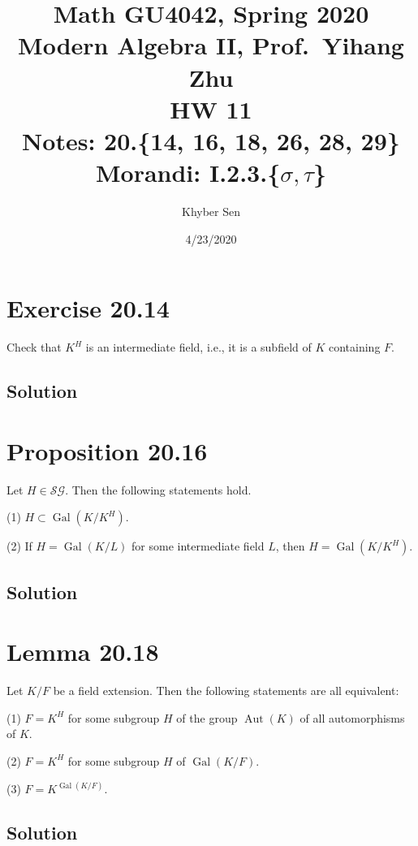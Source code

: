 \documentclass[fleqn]{article}
\title{
Math GU4042, Spring 2020 \\
Modern Algebra II, Prof.\ Yihang Zhu \\
HW 11 \\
Notes: 20.\{14, 16, 18, 26, 28, 29\} \\
Morandi: I.2.3.\{$\sigma, \tau$\} \\
}
\author{Khyber Sen}
\date{4/23/2020}
\DeclareMathOperator{\Gal}{Gal}
\DeclareMathOperator{\Aut}{Aut}
\begin{document}
    
    \maketitle
    
    \section{Exercise 20.14}
    Check that $K^H$ is an intermediate field, i.e., it is a subfield of $K$ containing $F$.
        
        \subsection{Solution}
        
    
    \section{Proposition 20.16}
    Let $H \in \mathcal{SG}$.  Then the following statements hold.
    
    (1) $H \subset \Gal\left(K/K^H\right)$.
    
    (2) If $H = \Gal(K/L)$ for some intermediate field $L$, then $H = \Gal\left(K/K^H\right)$.
        
        \subsection{Solution}
        
    
    \section{Lemma 20.18}
    Let $K/F$ be a field extension.  Then the following statements are all equivalent:
    
    (1) $F = K^H$ for some subgroup $H$ of the group $\Aut(K)$ of all automorphisms of $K$.
    
    (2) $F = K^H$ for some subgroup $H$ of $\Gal(K/F)$.
    
    (3) $F = K^{\Gal(K/F)}$.
        
        \subsection{Solution}
        
    
\end{document}
